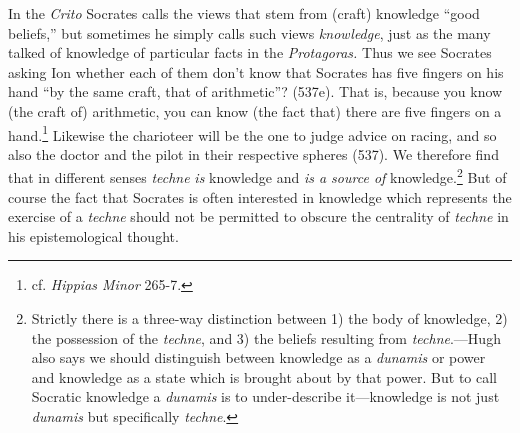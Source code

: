 ﻿\documentclass[11pt]{amsart}
\begin{document}
In the \emph{Crito} Socrates calls the views that stem from (craft) knowledge ``good beliefs,'' but sometimes he simply calls such views \emph{knowledge}, just as the many talked of knowledge of particular facts in the \emph{Protagoras.} Thus we see Socrates asking Ion whether each of them don't know that Socrates has five fingers on his hand ``by the same craft, that of arithmetic''? (537e). That is, because you know (the craft of) arithmetic, you can know (the fact that) there are five fingers on a hand.\footnote{cf. \emph{Hippias Minor} 265-7.} Likewise the charioteer will be the one to judge advice on racing, and so also the doctor and the pilot in their respective spheres (537). We therefore find that in different senses \emph{techne} \emph{is} knowledge and \emph{is a source of} knowledge.\footnote{Strictly there is a three-way distinction between 1) the body of knowledge, 2) the possession of the \emph{techne}, and 3) the beliefs resulting from \emph{techne}.---Hugh \citet[205--11]{benson2000swm} also says we should distinguish between knowledge as a \emph{dunamis} or power and knowledge as a state which is brought about by that power. But to call Socratic knowledge a \emph{dunamis} is to under-describe it---knowledge is not just \emph{dunamis} but specifically \emph{techne}.} But of course the fact that Socrates is often interested in knowledge which represents the exercise of a \emph{techne} should not be permitted to obscure the centrality of \emph{techne} in his epistemological thought.









\end{document}
